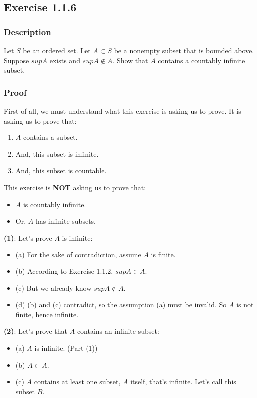\documentclass[12pt, letterpaper, oneside]{book}
\begin{document}
\subsection{Exercise 1.1.6}

\subsubsection{Description}

Let $S$ be an ordered set. Let $A \subset S$ be a nonempty subset that is bounded above. Suppose $sup A$ exists and
$sup A \notin A$. Show that $A$ contains a countably infinite subset.

\subsubsection{Proof}

First of all, we must understand what this exercise is asking us to prove. It is asking us to prove that:
\begin{enumerate}
  \item $A$ contains a subset.
  \item And, this subset is infinite.
  \item And, this subset is countable.
\end{enumerate}

This exercise is \textbf{NOT} asking us to prove that:
\begin{itemize}
  \item $A$ is countably infinite.
  \item Or, $A$ has infinite subsets.
\end{itemize}

\textbf{(1)}: Let's prove $A$ is infinite:
\begin{itemize}
  \item (a) For the sake of contradiction, assume $A$ is finite.
  \item (b) According to Exercise 1.1.2, $sup A \in A$.
  \item (c) But we already know $sup A \notin A$.
  \item (d) (b) and (c) contradict, so the assumption (a) must be invalid. So $A$ is not finite, hence infinite.
\end{itemize}

\textbf{(2)}: Let's prove that $A$ contains an infinite subset:
\begin{itemize}
  \item (a) $A$ is infinite. (Part (1))
  \item (b) $A \subset A$.
  \item (c) $A$ contains at least one subset, $A$ itself, that's infinite. Let's call this subset $B$.
\end{itemize}
\end{document}
